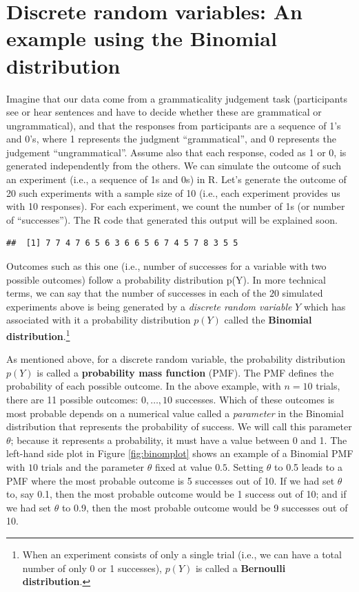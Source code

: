 \documentclass[12pt,]{krantz}
\begin{document}
\hypertarget{discrete-random-variables-an-example-using-the-binomial-distribution}{%
\section{Discrete random variables: An example using the Binomial distribution}\label{discrete-random-variables-an-example-using-the-binomial-distribution}}

Imagine that our data come from a grammaticality judgement task (participants see or hear sentences and have to decide whether these are grammatical or ungrammatical), and that the responses from participants are a sequence of 1's and 0's, where 1 represents the judgment ``grammatical'', and 0 represents the judgement ``ungrammatical''. Assume also that each response, coded as 1 or 0, is generated independently from the others. We can simulate the outcome of such an experiment (i.e., a sequence of 1s and 0s) in R. Let's generate the outcome of 20 such experiments with a sample size of 10 (i.e., each experiment provides us with 10 responses). For each experiment, we count the number of 1s (or number of ``successes''). The R code that generated this output will be explained soon.

\begin{verbatim}
##  [1] 7 7 4 7 6 5 6 3 6 6 5 6 7 4 5 7 8 3 5 5
\end{verbatim}

Outcomes such as this one (i.e., number of successes for a variable with two possible outcomes) follow a probability distribution p(Y). In more technical terms, we can say that the number of successes in each of the \(20\) simulated experiments above is being generated by a \emph{discrete random variable} \(Y\) which has associated with it a probability distribution \(p(Y)\) called the \textbf{Binomial distribution}.\footnote{When an experiment consists of only a single trial (i.e., we can have a total number of only 0 or 1 successes), \(p(Y)\) is called a \textbf{Bernoulli distribution}.}

As mentioned above, for a discrete random variable, the probability distribution \(p(Y)\) is called a \textbf{probability mass function} (PMF). The PMF defines the probability of each possible outcome. In the above example, with \(n=10\) trials, there are 11 possible outcomes: \(0,\dots,10\) successes. Which of these outcomes is most probable depends on a numerical value called a \emph{parameter} in the Binomial distribution that represents the probability of success. We will call this parameter \(\theta\); because it represents a probability, it must have a value between 0 and 1. The left-hand side plot in Figure \ref{fig:binomplot} shows an example of a Binomial PMF with \(10\) trials and the parameter \(\theta\) fixed at value \(0.5\). Setting \(\theta\) to 0.5 leads to a PMF where the most probable outcome is 5 successes out of 10. If we had set \(\theta\) to, say 0.1, then the most probable outcome would be 1 success out of 10; and if we had set \(\theta\) to 0.9, then the most probable outcome would be 9 successes out of 10.
\end{document}
